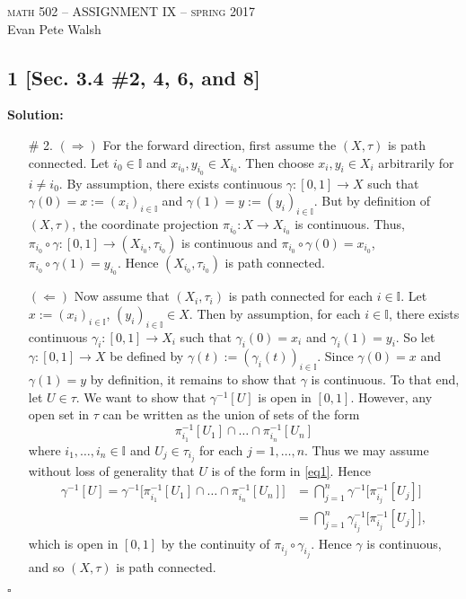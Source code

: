 \documentclass[12pt]{article}
\newcounter{ProofCounter}
\newenvironment{Solution}{\stepcounter{ProofCounter}\textbf{Solution:}}{\hfill$\square$}
\begin{document}
\thispagestyle{empty}
\begin{center}
  \Large \textsc{math 502 -- ASSIGNMENT IX -- spring 2017} \\ 
  \vspace{5mm}
  \large Evan Pete Walsh
\end{center}


\subsection*{1 [Sec. 3.4 \#2, 4, 6, and 8]}
\begin{Solution}
  \begin{enumerate}
    \item[\# 2.] $(\Rightarrow)$ For the forward direction, first assume the $(X,\tau)$ is path connected. Let $i_0 \in \mathbb{I}$ and $x_{i_0},
      y_{i_0} \in X_{i_0}$. Then choose $x_i, y_i \in X_i$ arbitrarily for $i \neq i_0$. By assumption, there exists continuous $\gamma : [0,1]
      \rightarrow X$ such that $\gamma(0) = x := (x_i)_{i\in\mathbb{I}}$ and $\gamma(1) = y := (y_i)_{i\in\mathbb{I}}$.
      But by definition of $(X, \tau)$, the coordinate projection $\pi_{i_0} : X \rightarrow X_{i_0}$ is continuous. Thus, $\pi_{i_0} \circ \gamma :
      [0,1] \rightarrow (X_{i_0}, \tau_{i_0})$ is continuous and $\pi_{i_0} \circ \gamma(0) = x_{i_0}$, $\pi_{i_0} \circ \gamma(1) = y_{i_0}$. Hence
      $(X_{i_0}, \tau_{i_0})$ is path connected.

      $(\Leftarrow)$ Now assume that $(X_i, \tau_i)$ is path connected for each $i \in \mathbb{I}$. Let $x := \left( x_i \right)_{i\in\mathbb{I}}$, 
      $\left( y_i \right)_{i\in\mathbb{I}} \in X$. Then by assumption, for each $i \in \mathbb{I}$, there exists continuous $\gamma_i : [0,1]
      \rightarrow X_i$ such that $\gamma_i(0) = x_i$ and $\gamma_i(1) = y_i$. So let $\gamma : [0,1] \rightarrow X$ be defined by $\gamma(t) := \left(
      \gamma_i(t) \right)_{i\in\mathbb{I}}$. Since $\gamma(0) = x$ and $\gamma(1) = y$ by definition, it remains to show that $\gamma$ is continuous.
      To that end, let $U \in \tau$. We want to show that $\gamma^{-1}[U]$ is open in $[0,1]$. However, any open set in $\tau$ can be written as
      the union of sets of the form 
      \begin{equation}
        \pi_{i_1}^{-1}[U_1] \cap \dots \cap \pi_{i_n}^{-1}[U_n]
        \label{eq1}
      \end{equation}
      where $i_1, \dots, i_n \in \mathbb{I}$ and $U_j \in \tau_{i_j}$ for each $j = 1, \dots, n$. Thus we may assume without loss of generality
      that $U$ is of the form in \eqref{eq1}. Hence
      \begin{align*}
        \gamma^{-1}[U] = \gamma^{-1}\bigg[\pi_{i_1}^{-1}[U_1] \cap \dots \cap \pi_{i_n}^{-1}[U_n]\bigg] & =
        \bigcap_{j=1}^{n}\gamma^{-1}\bigg[\pi_{i_j}^{-1}[U_j]\bigg] \\
        & = \bigcap_{j=1}^{n} \gamma_{i_j}^{-1}\bigg[ \pi_{i_j}^{-1}[U_j] \bigg],
      \end{align*}
      which is open in $[0,1]$ by the continuity of $\pi_{i_j} \circ \gamma_{i_j}$. Hence $\gamma$ is continuous, and so $(X,\tau)$ is path connected.


\end{enumerate}
\end{Solution}
\end{document}
